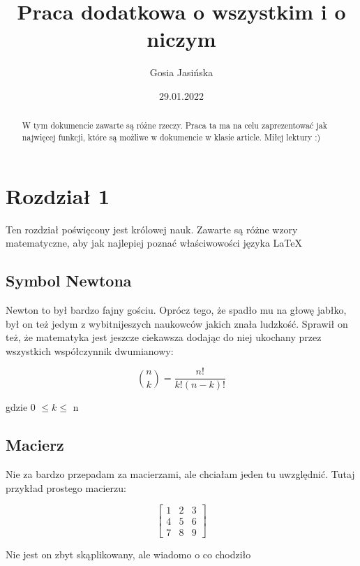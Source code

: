 \documentclass{article}
\title{Praca dodatkowa o wszystkim i o niczym}
\author{Gosia Jasińska}
\date{29.01.2022}
\begin{document}
		
\maketitle

\newpage
\begin{abstract}
	W tym dokumencie zawarte są różne rzeczy. Praca ta ma na celu zaprezentować jak najwięcej funkcji, które są możliwe w dokumencie w klasie article. Miłej lektury :)
\end{abstract}

\newpage
\tableofcontents
\listoffigures
\listoftables

\newpage
\section{Rozdział 1}
Ten rozdział poświęcony jest królowej nauk. Zawarte są różne wzory matematyczne, aby jak najlepiej poznać właściwowości języka \LaTeX

\subsection{Symbol Newtona }
Newton to był bardzo fajny gościu. Oprócz tego, że spadło mu na głowę jabłko, był on też jedym z wybitnijeszych naukowców jakich znała ludzkość. Sprawił on też, że matematyka jest jeszcze ciekawsza dodając do niej ukochany przez wszystkich  współczynnik dwumianowy: 

\begin{equation}
	{n \choose k}=\frac{n!}{k!(n-k)!}
\end{equation}

gdzie 0 $\le k $$\le$  n

\subsection{Macierz }
Nie za bardzo przepadam za macierzami, ale chciałam jeden tu uwzględnić. Tutaj przykład prostego macierzu:

\begin{displaymath}
	\left[\begin{array}{ccc}
		1 & 2 & 3 \\
		4 & 5 & 6 \\
		7 & 8 & 9 
	\end{array}\right] 
\end{displaymath}
	
Nie jest on zbyt skąplikowany, ale wiadomo o co chodziło
	
\end{document}

